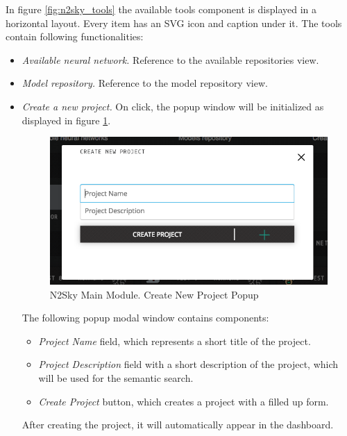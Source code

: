 In figure \ref{fig:n2sky_tools} the available tools component is displayed in a horizontal layout. Every item has an SVG icon and caption under it. The tools contain following functionalities: 
\begin{itemize}
\item \emph{Available neural network.} Reference to the available repositories view.  
\item \emph{Model repository.} Reference to the model repository view.
\item \emph{Create a new project.} On click, the popup window will be initialized as displayed in figure \ref{fig:popupcreatenewproject}.


\begin{figure}[H]
\begin{center}
  \includegraphics[scale=0.5]{components/5/img/popupcreatenewproject.png}
  \caption{N2Sky Main Module. Create New Project Popup}
  \label{fig:popupcreatenewproject}
\end{center}
\end{figure}


The following popup modal window contains components:
\begin{itemize}
\item \emph{Project Name} field, which represents a short title of the project.
\item \emph{Project Description} field with a short description of the project, which will be used for the semantic search.  
\item \emph{Create Project} button, which creates a project with a filled up form.
\end{itemize}

After creating the project, it will automatically appear in the dashboard. 

\end{itemize}

